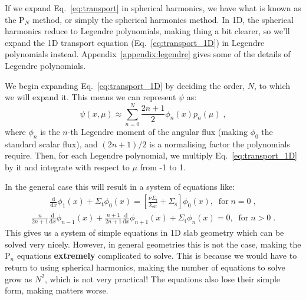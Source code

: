 \documentclass{article}
\begin{document}
If we expand Eq.~\eqref{eq:transport} in spherical harmonics, we have what is known as the P$_N$ method, or simply the spherical harmonics method. In 1D, the spherical harmonics reduce to Legendre polynomials, making thing a bit clearer, so we'll expand the 1D transport equation (Eq.~\eqref{eq:transport_1D}) in Legendre polynomials instead. Appendix~\ref{appendix:legendre} gives some of the details of Legendre polynomials.

We begin expanding Eq.~\eqref{eq:transport_1D} by deciding the order, $N$, to which we will expand it. This means we can represent $\psi$ as:
\begin{equation}
    \psi(x,\mu)\approx\sum^N_{n=0}\frac{2n+1}{2}\phi_n(x)p_n(\mu)\;\mathrm{,}
\end{equation}
where $\phi_n$ is the $n$-th Legendre moment of the angular flux (making $\phi_0$ the standard scalar flux), and $(2n+1)/2$ is a normalising factor the polynomials require.
Then, for each Legendre polynomial, we multiply Eq.~\eqref{eq:transport_1D} by it and integrate with respect to $\mu$ from -1 to 1. 

In the general case this will result in a system of equations like:
\begin{equation}
    \begin{split}
 \frac{\mathrm{d}}{\mathrm{d}x}\phi_1(x) + \Sigma_\mathrm{t}\phi_0(x)
    =\left[\frac{\bar{\nu}\Sigma_\mathrm{f}}{ k_\mathrm{eff}} + \Sigma_\mathrm{s}\right]\phi_0(x)\mathrm{,}\;\;\mathrm{for }\; n = 0\;\mathrm{,}
    \end{split}
\end{equation}
\begin{equation}
    \begin{split}
 \frac{n}{2n+1}\frac{\mathrm{d}}{\mathrm{d}x}\phi_{n-1}(x) +  \frac{n+1}{2n+1}\frac{\mathrm{d}}{\mathrm{d}x}\phi_{n+1}(x) + \Sigma_\mathrm{t}\phi_n(x)
    =0\mathrm{,}\;\;\mathrm{for }\;n > 0\;\mathrm{.}
    \end{split}
\end{equation}
This gives us a system of simple equations in 1D slab geometry which can be solved very nicely. However, in general geometries this is not the case, making the P$_n$ equations \textbf{extremely} complicated to solve. This is because we would have to return to using spherical harmonics, making the number of equations to solve grow as $N^2$, which is not very practical! The equations also lose their simple form, making matters worse.
\end{document}
